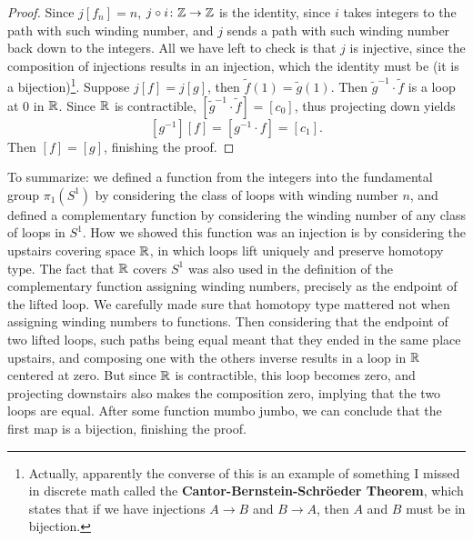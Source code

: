 \begin{proof}
    Since $j[f_n ]=n$, $j\circ i \colon \mathbb{Z} \to \mathbb{Z}$ is the identity, since $i$ takes integers to the path with such winding number, and $j$ sends a path with such winding number back down to the integers. All we have left to check is that $j$ is injective, since the composition of injections results in an injection, which the identity must be (it is a bijection)\footnote{Actually, apparently the converse of this is an example of something I missed in discrete math called the \textbf{Cantor-Bernstein-Schr\"oeder Theorem}, which states that if we have injections $A\to B$ and $B\to A$, then $A$ and $B$ must be in bijection.}. Suppose $j[f]=j[g]$, then $\widetilde f(1)=\widetilde g(1)$. Then $\widetilde g^{-1}\cdot \widetilde f$ is a loop at $0$ in $\mathbb{R}$. Since $\mathbb{R}$ is contractible, $[\widetilde g^{-1}\cdot \widetilde f]=[c_0]$, thus projecting down yields \[
        [g^{-1}][f]=[g^{-1}\cdot f]=[c_1].
    \] Then $[f]=[g]$, finishing the proof.
\end{proof}
To summarize: we defined a function from the integers into the fundamental group $\pi_1(S^1 )$ by considering the class of loops with winding number $n$, and defined a complementary function by considering the winding number of any class of loops in $S^1 $. How we showed this function was an injection is by considering the upstairs covering space $\mathbb{R}$, in which loops lift uniquely and preserve homotopy type. The fact that $\mathbb{R}$ covers $S^1 $ was also used in the definition of the complementary function assigning winding numbers, precisely as the endpoint of the lifted loop. We carefully made sure that homotopy type mattered not when assigning winding numbers to functions. Then considering that the endpoint of two lifted  loops, such paths being equal meant that they ended in the same place upstairs, and composing one with the others inverse results in a loop in $\mathbb{R}$ centered at zero. But since $\mathbb{R}$ is contractible, this loop becomes zero, and projecting downstairs also makes the composition zero, implying that the two loops are equal. After some function mumbo jumbo, we can conclude that the first map is a bijection, finishing the proof.

